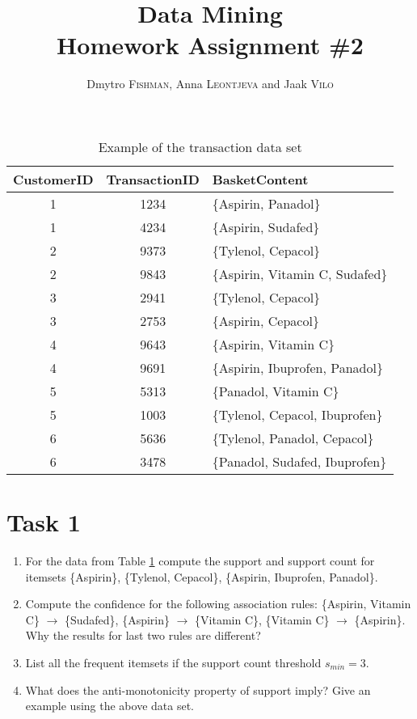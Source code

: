 \documentclass{article}
\title{Data Mining\\Homework Assignment \#2} %
\author{Dmytro \textsc{Fishman}, Anna \textsc{Leontjeva} and Jaak \textsc{Vilo}} %
\begin{document}
\maketitle %
\begin{table}[h]
\caption{Example of the transaction data set}
\label{tab:toyexample}
\begin{center}
    \begin{tabular}{| c | c | l|}
    \hline
    CustomerID & TransactionID& BasketContent \\ \hline
    	1 & 1234 & \{Aspirin, Panadol\}\\ \hline
    	1 & 4234 & \{Aspirin, Sudafed\}\\ \hline
    	2 & 9373& \{Tylenol, Cepacol\}\\ \hline
	2 & 9843& \{Aspirin, Vitamin C, Sudafed\}\\ \hline 
	3 & 2941& \{Tylenol, Cepacol\}\\ \hline  
	3 & 2753& \{Aspirin, Cepacol\}\\ \hline
	4 & 9643& \{Aspirin, Vitamin C\}\\ \hline
	4 & 9691& \{Aspirin, Ibuprofen, Panadol\}\\ \hline
	5 & 5313& \{Panadol, Vitamin C\}\\ \hline
	5 & 1003& \{Tylenol, Cepacol, Ibuprofen\}\\ \hline
	6 & 5636& \{Tylenol, Panadol, Cepacol\}\\ \hline
	6 & 3478& \{Panadol, Sudafed, Ibuprofen\}\\ \hline
 \end{tabular}
\end{center}
\end{table}
\section*{Task 1}
\begin{enumerate}
\item For the data from Table \ref{tab:toyexample} compute the support and support count for itemsets \{Aspirin\}, \{Tylenol, Cepacol\}, \{Aspirin, Ibuprofen, Panadol\}.
\item Compute the confidence for the following association rules: \{Aspirin, Vitamin C\} $\rightarrow$ \{Sudafed\}, \{Aspirin\} $\rightarrow$ \{Vitamin C\}, \{Vitamin C\} $\rightarrow$ \{Aspirin\}. Why the results for last two rules are different?
\item List all the frequent itemsets if the support count threshold $s_{min} = 3$.
\item What does the anti-monotonicity property of support imply? Give an example using the above data set. 
\end{enumerate}
\end{document}
